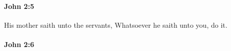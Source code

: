 		\paragraph{John 2:5} %
			\label{JOHN-2-5}

			His mother saith unto the servants, Whatsoever he saith unto you, do it.

			\begin{framed}
			\scriptsize
				\begin{compactdesc}
					\item[SBLG] 
				\end{compactdesc}
			\end{framed}

		\paragraph{John 2:6} %
			\label{JOHN-2-6}

